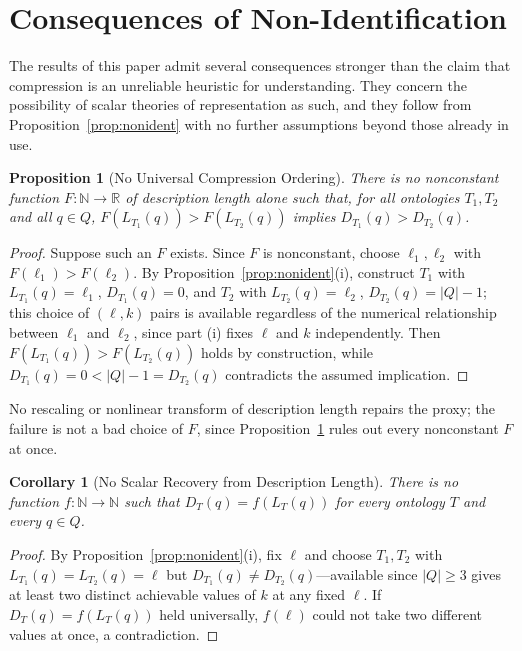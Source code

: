 \documentclass[11pt]{article}
\theoremstyle{plain}
\newtheorem{proposition}{Proposition}
\newtheorem{corollary}{Corollary}
\begin{document}
\section{Consequences of Non-Identification}
\label{app:consequences}

The results of this paper admit several consequences stronger than the claim that compression is an unreliable heuristic for understanding. They concern the possibility of scalar theories of representation as such, and they follow from Proposition~\ref{prop:nonident} with no further assumptions beyond those already in use.

\begin{proposition}[No Universal Compression Ordering]
\label{prop:no-universal-order}
There is no nonconstant function $F : \mathbb{N} \to \mathbb{R}$ of description length alone such that, for all ontologies $T_1, T_2$ and all $q \in Q$, $F(L_{T_1}(q)) > F(L_{T_2}(q))$ implies $D_{T_1}(q) > D_{T_2}(q)$.
\end{proposition}

\begin{proof}
Suppose such an $F$ exists. Since $F$ is nonconstant, choose $\ell_1, \ell_2$ with $F(\ell_1) > F(\ell_2)$. By Proposition~\ref{prop:nonident}(i), construct $T_1$ with $L_{T_1}(q) = \ell_1$, $D_{T_1}(q) = 0$, and $T_2$ with $L_{T_2}(q) = \ell_2$, $D_{T_2}(q) = |Q|-1$; this choice of $(\ell,k)$ pairs is available regardless of the numerical relationship between $\ell_1$ and $\ell_2$, since part (i) fixes $\ell$ and $k$ independently. Then $F(L_{T_1}(q)) > F(L_{T_2}(q))$ holds by construction, while $D_{T_1}(q) = 0 < |Q|-1 = D_{T_2}(q)$ contradicts the assumed implication.
\end{proof}

No rescaling or nonlinear transform of description length repairs the proxy; the failure is not a bad choice of $F$, since Proposition~\ref{prop:no-universal-order} rules out every nonconstant $F$ at once.

\begin{corollary}[No Scalar Recovery from Description Length]
\label{cor:no-scalar-recovery}
There is no function $f : \mathbb{N} \to \mathbb{N}$ such that $D_T(q) = f(L_T(q))$ for every ontology $T$ and every $q \in Q$.
\end{corollary}

\begin{proof}
By Proposition~\ref{prop:nonident}(i), fix $\ell$ and choose $T_1, T_2$ with $L_{T_1}(q) = L_{T_2}(q) = \ell$ but $D_{T_1}(q) \ne D_{T_2}(q)$---available since $|Q| \ge 3$ gives at least two distinct achievable values of $k$ at any fixed $\ell$. If $D_T(q) = f(L_T(q))$ held universally, $f(\ell)$ could not take two different values at once, a contradiction.
\end{proof}
\end{document}
